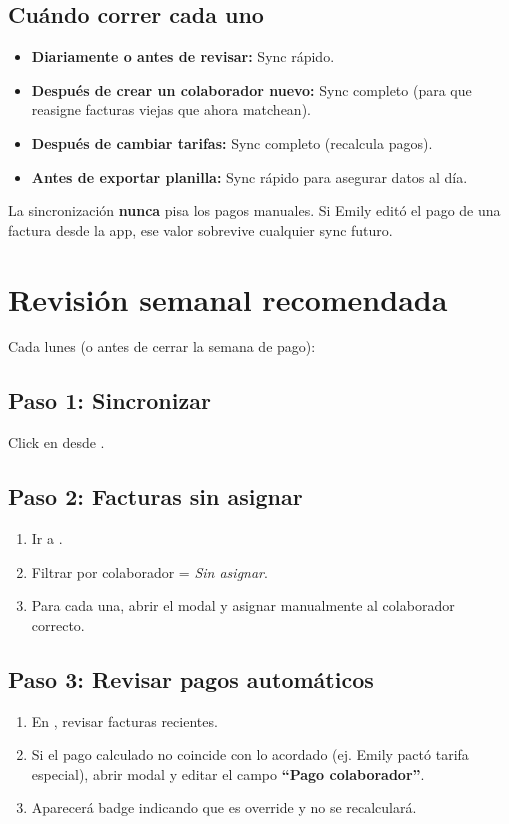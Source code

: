 \documentclass[11pt,a4paper]{article}
\begin{document}
\subsection{Cuándo correr cada uno}

\begin{itemize}
  \item \textbf{Diariamente o antes de revisar:} Sync rápido.
  \item \textbf{Después de crear un colaborador nuevo:} Sync completo (para que reasigne facturas viejas que ahora matchean).
  \item \textbf{Después de cambiar tarifas:} Sync completo (recalcula pagos).
  \item \textbf{Antes de exportar planilla:} Sync rápido para asegurar datos al día.
\end{itemize}

\begin{infobox}
La sincronización \textbf{nunca} pisa los pagos manuales. Si Emily editó el pago de una factura desde la app, ese valor sobrevive cualquier sync futuro.
\end{infobox}

\section{Revisión semanal recomendada}

Cada lunes (o antes de cerrar la semana de pago):

\subsection{Paso 1: Sincronizar}
Click en  desde .

\subsection{Paso 2: Facturas sin asignar}
\begin{enumerate}
  \item Ir a .
  \item Filtrar por colaborador = \textit{Sin asignar}.
  \item Para cada una, abrir el modal y asignar manualmente al colaborador correcto.
\end{enumerate}

\subsection{Paso 3: Revisar pagos automáticos}
\begin{enumerate}
  \item En , revisar facturas recientes.
  \item Si el pago calculado no coincide con lo acordado (ej. Emily pactó tarifa especial), abrir modal y editar el campo \textbf{``Pago colaborador''}.
  \item Aparecerá badge  indicando que es override y no se recalculará.
\end{enumerate}
\end{document}
